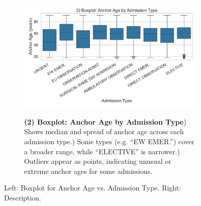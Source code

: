 \begin{figure}[ht!]
    \centering
    \begin{subfigure}{0.42\textwidth}
        \includegraphics[width=\linewidth]{mimic_plots/plot2.jpg}
    \end{subfigure}\hfill
    \begin{subfigure}{0.54\textwidth}
        \footnotesize
        \textbf{(2) Boxplot: Anchor Age by Admission Type}) Shows median and spread of anchor age across each admission type.) Some types (e.g. “EW EMER.”) cover a broader range, while “ELECTIVE” is narrower.) Outliers appear as points, indicating unusual or extreme anchor ages for some admissions.
    \end{subfigure}
    \caption{Left: Boxplot for Anchor Age vs. Admission Type. Right: Description.}
    \label{fig:plot2}
\end{figure}

